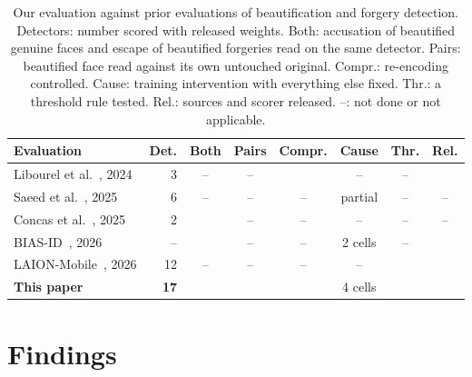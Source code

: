 \documentclass[journal]{IEEEtran}  %
\newcommand{\xmark}{--}
\newcommand{\cmark}{\checkmark}
\begin{document}
\begin{table}[t]
\centering
\caption{Our evaluation against prior evaluations of beautification and forgery detection. Detectors: number scored with
released weights. Both: accusation of beautified genuine faces and escape of beautified forgeries read on the same detector.
Pairs: beautified face read against its own untouched original. Compr.: re-encoding controlled. Cause: training intervention
with everything else fixed. Thr.: a threshold rule tested. Rel.: sources and scorer released. --: not done or not applicable.}
\label{tab:compare}
\footnotesize
\setlength{\tabcolsep}{3.5pt}
\begin{tabular}{@{}l r c c c c c c@{}}
\toprule
Evaluation & Det. & Both & Pairs & Compr. & Cause & Thr. & Rel. \\
\midrule
Libourel et al.~\cite{libourel2024}, 2024 & 3 & \xmark & \xmark & \cmark & \xmark & \xmark & \cmark \\
Saeed et al.~\cite{saeed2025}, 2025 & 6 & \xmark & \xmark & \xmark & partial & \xmark & \xmark \\
Concas et al.~\cite{concas2025}, 2025 & 2 & \cmark & \xmark & \xmark & \xmark & \xmark & \xmark \\
BIAS-ID~\cite{ricker2026biasid}, 2026 & -- & \cmark & \xmark & \xmark & 2 cells & \xmark & \cmark \\
LAION-Mobile~\cite{laionmobile2026}, 2026 & 12 & \xmark & \xmark & \xmark & \xmark & \cmark & \cmark \\
\textbf{This paper} & \textbf{17} & \cmark & \cmark & \cmark & 4 cells & \cmark & \cmark \\
\bottomrule
\end{tabular}
\end{table}


\section{Findings}
\label{sec:findings}
\end{document}
